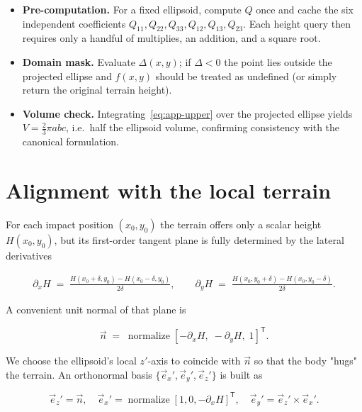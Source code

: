 \begin{itemize}
\item \textbf{Pre-computation.} For a fixed ellipsoid, compute $Q$ once and cache the six independent coefficients $Q_{11},Q_{22},Q_{33},Q_{12},Q_{13},Q_{23}$. Each height query then requires only a handful of multiplies, an addition, and a square root.

\item \textbf{Domain mask.} Evaluate $\Delta(x,y)$; if $\Delta<0$ the point lies outside the projected ellipse and $f(x,y)$ should be treated as undefined (or simply return the original terrain height).

\item \textbf{Volume check.} Integrating~\eqref{eq:app-upper} over the projected ellipse yields $V = \tfrac23\pi abc$, i.e.\ half the ellipsoid volume, confirming consistency with the canonical formulation.

\end{itemize}


\section{Alignment with the local terrain}
\label{app:ellipsoid-alignment}

For each impact position $(x_0,y_0)$ the terrain offers only a scalar height $H(x_0,y_0)$, but its first-order tangent plane is fully determined by the lateral derivatives

\begin{align}
    \partial_x H \;=\;
    \frac{H(x_0+\delta,y_0)-H(x_0-\delta,y_0)}{2\delta},
    \qquad
    \partial_y H \;=\;
    \frac{H(x_0,y_0+\delta)-H(x_0,y_0-\delta)}{2\delta}.
\end{align}

A convenient unit normal of that plane is

\begin{equation}
    \label{eq:app-terrain-normal}
    \vec n \;=\; 
    \operatorname{normalize}
    \left[ -\partial_x H,\; -\partial_y H,\; 1 \right]^{\mathsf T}.
\end{equation}

We choose the ellipsoid's local $z'$-axis to coincide with $\vec n$ so that the body "hugs" the terrain.  An orthonormal basis $\{ \vec e_x',\vec e_y',\vec e_z' \}$ is built as

\begin{equation}
    \vec e_z' = \vec n,
    \quad
    \vec e_x' = 
    \operatorname{normalize}\!\left[ 1,0,-\partial_x H \right]^{\mathsf T},
    \quad
    \vec e_y' = \vec e_z' \times \vec e_x'.
\end{equation}

